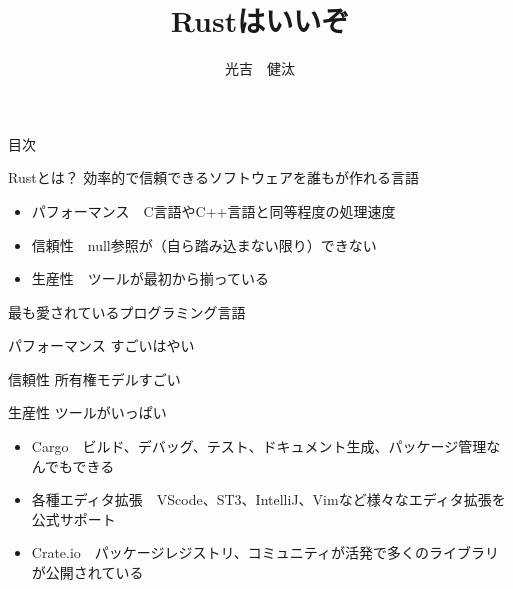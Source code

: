 \documentclass[12pt, dvipdfmx]{beamer}
\title{Rustはいいぞ}
\institute{北海道大学　情報知識ネットワーク研究室　M1}
\author{光吉　健汰}
\begin{document}
\maketitle
\begin{frame}{目次}
	\small
	\tableofcontents
\end{frame}

\begin{frame}{Rustとは？}
	効率的で信頼できるソフトウェアを誰もが作れる言語\footnotemark

	\begin{itemize}
		\item パフォーマンス　C言語やC++言語と同等程度の処理速度
		\item 信頼性　null参照が（自ら踏み込まない限り）できない
		\item 生産性　ツールが最初から揃っている
	\end{itemize}

	最も愛されているプログラミング言語\footnotemark

\end{frame}

\begin{frame}{パフォーマンス}
	すごいはやい
\end{frame}

\begin{frame}{信頼性}
	所有権モデルすごい
\end{frame}

\begin{frame}{生産性}
	ツールがいっぱい
	\begin{itemize}
		\item Cargo　ビルド、デバッグ、テスト、ドキュメント生成、パッケージ管理なんでもできる
		\item 各種エディタ拡張　VScode、ST3、IntelliJ、Vimなど様々なエディタ拡張を公式サポート
		\item Crate.io　パッケージレジストリ、コミュニティが活発で多くのライブラリが公開されている
	\end{itemize}
\end{frame}
\end{document}
